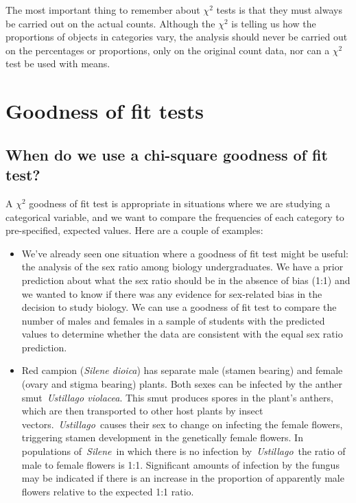 \documentclass[
]{book}
\begin{document}
The most important thing to remember about \(\chi^{2}\) tests is that they must always be carried out on the actual counts. Although the \(\chi^{2}\) is telling us how the proportions of objects in categories vary, the analysis should never be carried out on the percentages or proportions, only on the original count data, nor can a \(\chi^{2}\) test be used with means.

\hypertarget{goodness-of-fit-tests}{%
\chapter{Goodness of fit tests}\label{goodness-of-fit-tests}}

\hypertarget{when-do-we-use-a-chi-square-goodness-of-fit-test}{%
\section{When do we use a chi-square goodness of fit test?}\label{when-do-we-use-a-chi-square-goodness-of-fit-test}}

A \(\chi^{2}\) goodness of fit test is appropriate in situations where we are studying a categorical variable, and we want to compare the frequencies of each category to pre-specified, expected values. Here are a couple of examples:

\begin{itemize}
\item
  We've already seen one situation where a goodness of fit test might be useful: the analysis of the sex ratio among biology undergraduates. We have a prior prediction about what the sex ratio should be in the absence of bias (1:1) and we wanted to know if there was any evidence for sex-related bias in the decision to study biology. We can use a goodness of fit test to compare the number of males and females in a sample of students with the predicted values to determine whether the data are consistent with the equal sex ratio prediction.
\item
  Red campion (\emph{Silene dioica}) has separate male (stamen bearing) and female (ovary and stigma bearing) plants. Both sexes can be infected by the anther smut~\emph{Ustillago violacea}. This smut produces spores in the plant's anthers, which are then transported to other host plants by insect vectors.~\emph{Ustillago}~causes their sex to change on infecting the female flowers, triggering stamen development in the genetically female flowers. In populations of~\emph{Silene}~in which there is no infection by~\emph{Ustillago}~the ratio of male to female flowers is 1:1. Significant amounts of infection by the fungus may be indicated if there is an increase in the proportion of apparently male flowers relative to the expected 1:1 ratio.
\end{itemize}
\end{document}
